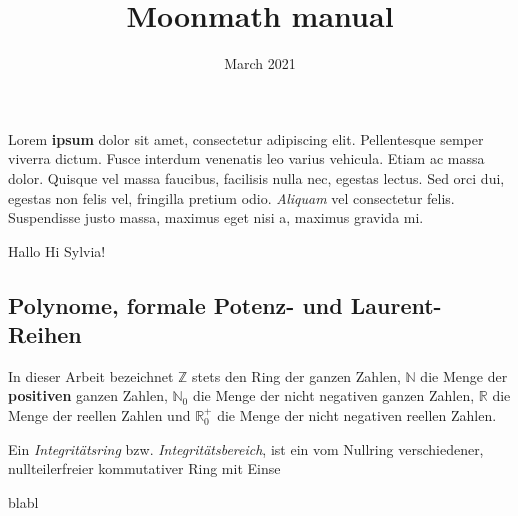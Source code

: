 \documentclass{article}
\title{Moonmath manual}
\author{}
\date{March 2021}
\begin{document}
\maketitle

Lorem \textbf{ipsum} dolor sit amet, consectetur adipiscing elit. Pellentesque semper viverra dictum.  Fusce interdum venenatis leo varius vehicula. Etiam ac massa dolor. Quisque vel massa faucibus, facilisis nulla nec, egestas lectus. Sed orci dui, egestas non felis vel, fringilla pretium odio. \textit{Aliquam} vel consectetur felis. Suspendisse justo massa, maximus eget nisi a, maximus gravida mi.

Hallo
Hi Sylvia!



\subsection{Polynome, formale Potenz- und Laurent-Reihen}

In dieser Arbeit bezeichnet $\mathbb{Z}$ stets den Ring der ganzen Zahlen, $\mathbb{N}$ die Menge der \textbf{positiven} ganzen Zahlen, 
$\mathbb{N}_0$ die Menge der nicht negativen ganzen Zahlen, 
$\mathbb{R}$ die Menge der reellen Zahlen und $\mathbb{R}^+_0$ die Menge
der nicht negativen reellen Zahlen.

Ein \textit{Integritätsring} bzw. \textit{Integritätsbereich}, ist ein vom Nullring verschiedener, nullteilerfreier kommutativer Ring mit Einse

blabl
\end{document}

